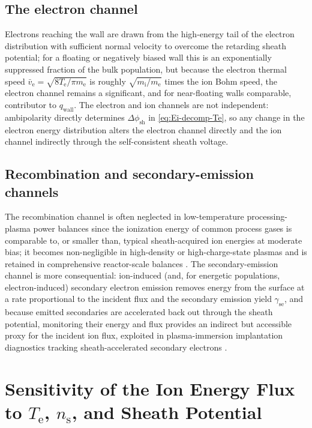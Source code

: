 \subsection{The electron channel}

Electrons reaching the wall are drawn from the high-energy tail of the electron distribution with sufficient normal velocity to overcome the retarding sheath potential; for a floating or negatively biased wall this is an exponentially suppressed fraction of the bulk population, but because the electron thermal speed $\bar v_{\mathrm{e}} = \sqrt{8T_{\mathrm{e}}/\pi m_{\mathrm{e}}}$ is roughly $\sqrt{m_{\mathrm{i}}/m_{\mathrm{e}}}$ times the ion Bohm speed, the electron channel remains a significant, and for near-floating walls comparable, contributor to $q_{\mathrm{wall}}$. The electron and ion channels are not independent: ambipolarity directly determines $\Delta\phi_{\mathrm{sh}}$ in \cref{eq:Ei-decomp-Te}, so any change in the electron energy distribution alters the electron channel directly and the ion channel indirectly through the self-consistent sheath voltage.

\subsection{Recombination and secondary-emission channels}

The recombination channel is often neglected in low-temperature processing-plasma power balances since the ionization energy of common process gases is comparable to, or smaller than, typical sheath-acquired ion energies at moderate bias; it becomes non-negligible in high-density or high-charge-state plasmas and is retained in comprehensive reactor-scale balances \cite{ref0093}. The secondary-emission channel is more consequential: ion-induced (and, for energetic populations, electron-induced) secondary electron emission removes energy from the surface at a rate proportional to the incident flux and the secondary emission yield $\gamma_{\mathrm{se}}$, and because emitted secondaries are accelerated back out through the sheath potential, monitoring their energy and flux provides an indirect but accessible proxy for the incident ion flux, exploited in plasma-immersion implantation diagnostics tracking sheath-accelerated secondary electrons \cite{ref0078}.

\section{Sensitivity of the Ion Energy Flux to \texorpdfstring{$T_{\mathrm{e}}$}{Te}, \texorpdfstring{$n_{\mathrm{s}}$}{ns}, and Sheath Potential}

